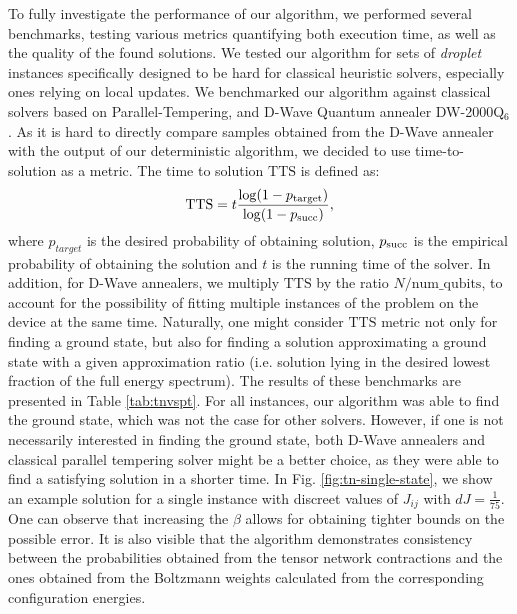 To fully investigate the performance of our algorithm, we performed several
benchmarks, testing various metrics quantifying both execution time, as well as
the quality of the found solutions. We tested our algorithm for sets of
\emph{droplet} instances specifically designed to be hard for classical
heuristic solvers, especially ones relying on local updates. We benchmarked our
algorithm against classical solvers based on Parallel-Tempering, and D-Wave
Quantum annealer DW-2000Q$_6$. As it is hard to directly compare samples
obtained from the D-Wave annealer with the output of our deterministic
algorithm, we decided to use time-to-solution as a metric. The time to solution
$\mbox{TTS}$ is defined as:
\begin{equation}
  \label{eq:tts}
  \mbox{TTS} = t \frac{\log(1 - p_{\text{target}})}{\log(1 - p_{\text{succ}})},
\end{equation}
where $p_{target}$ is the desired probability of obtaining solution, $p_{\text{succ}}$
is the empirical probability of obtaining the solution and $t$ is the running
time of the solver. In addition, for D-Wave annealers, we multiply $\mbox{TTS}$
by the ratio $N/\mbox{num\_qubits}$, to account for the possibility of fitting
multiple instances of the problem on the device at the same time. Naturally,
one might consider $\mbox{TTS}$ metric not only for finding a ground state, but
also for finding a solution approximating a ground state with a given
approximation ratio (i.e. solution lying in the desired lowest fraction of the
full energy spectrum). The results of these benchmarks are presented in Table
\ref{tab:tnvspt}. For all instances, our algorithm was able to find the ground
state, which was not the case for other solvers. However, if one is not
necessarily interested in finding the ground state, both D-Wave annealers and
classical parallel tempering solver might be a better choice, as they were able
to find a satisfying solution in a shorter time. In Fig.
\ref{fig:tn-single-state}, we show an example solution for a single instance
with discreet values of $J_{ij}$ with $dJ=\frac{1}{75}$. One can observe that
increasing the $\beta$ allows for obtaining tighter bounds on the possible
error. It is also visible that the algorithm demonstrates consistency between
the probabilities obtained from the tensor network contractions and the ones
obtained from the Boltzmann weights calculated from the corresponding
configuration energies.

